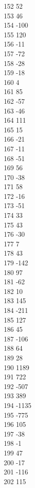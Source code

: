 { 152	52 \\
 153	46 \\
 154	-100 \\
 155	120 \\
 156	-11 \\
 157	-72 \\
 158	-28 \\
 159	-18 \\
 160	4 \\
 161	85 \\
 162	-57 \\
 163	-46 \\
 164	111 \\
 165	15 \\
 166	-21 \\
 167	-11 \\
 168	-51 \\
 169	56 \\
 170	-38 \\
 171	58 \\
 172	-16 \\
 173	-51 \\
 174	33 \\
 175	43 \\
 176	-30 \\
 177	7 \\
 178	43 \\
 179	-142 \\
 180	97 \\
 181	-62 \\
 182	10 \\
 183	145 \\
 184	-211 \\
 185	127 \\
 186	45 \\
 187	-106 \\
 188	64 \\
 189	28 \\
 190	1189 \\
 191	722 \\
 192	-507 \\
 193	389 \\
 194	-1135 \\
 195	-775 \\
 196	105 \\
 197	-38 \\
 198	-1 \\
 199	47 \\
 200	-17 \\
 201	-116 \\
 202	115 \\
}
